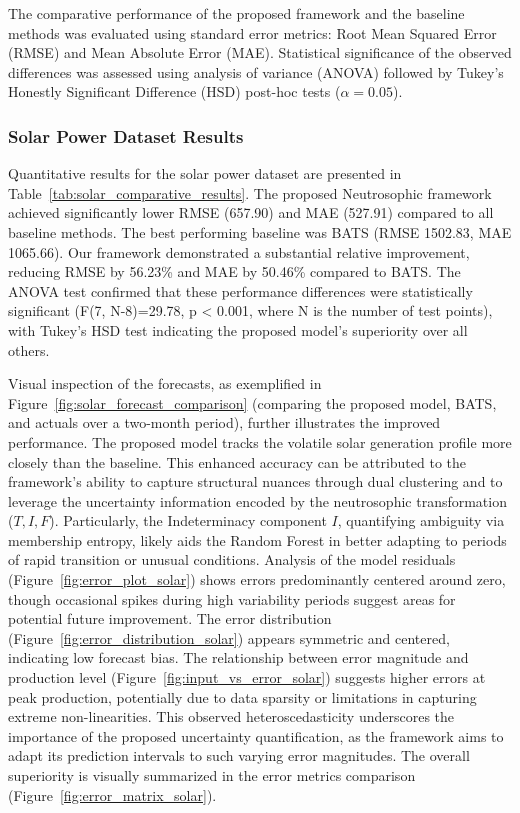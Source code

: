 \documentclass[review,3p,times]{elsarticle}
\begin{document}
The comparative performance of the proposed framework and the baseline methods was evaluated using standard error metrics: Root Mean Squared Error (RMSE) and Mean Absolute Error (MAE). Statistical significance of the observed differences was assessed using analysis of variance (ANOVA) followed by Tukey's Honestly Significant Difference (HSD) post-hoc tests ($\alpha = 0.05$).

\subsubsection{Solar Power Dataset Results}
\label{subsec:solar_results}

Quantitative results for the solar power dataset are presented in Table~\ref{tab:solar_comparative_results}. The proposed Neutrosophic framework achieved significantly lower RMSE (657.90) and MAE (527.91) compared to all baseline methods. The best performing baseline was BATS (RMSE 1502.83, MAE 1065.66). Our framework demonstrated a substantial relative improvement, reducing RMSE by 56.23\% and MAE by 50.46\% compared to BATS. The ANOVA test confirmed that these performance differences were statistically significant (F(7, N-8)=29.78, p < 0.001, where N is the number of test points), with Tukey's HSD test indicating the proposed model's superiority over all others.

Visual inspection of the forecasts, as exemplified in Figure~\ref{fig:solar_forecast_comparison} (comparing the proposed model, BATS, and actuals over a two-month period), further illustrates the improved performance. The proposed model tracks the volatile solar generation profile more closely than the baseline. This enhanced accuracy can be attributed to the framework's ability to capture structural nuances through dual clustering and to leverage the uncertainty information encoded by the neutrosophic transformation ($T, I, F$). Particularly, the Indeterminacy component $I$, quantifying ambiguity via membership entropy, likely aids the Random Forest in better adapting to periods of rapid transition or unusual conditions. Analysis of the model residuals (Figure~\ref{fig:error_plot_solar}) shows errors predominantly centered around zero, though occasional spikes during high variability periods suggest areas for potential future improvement. The error distribution (Figure~\ref{fig:error_distribution_solar}) appears symmetric and centered, indicating low forecast bias. The relationship between error magnitude and production level (Figure~\ref{fig:input_vs_error_solar}) suggests higher errors at peak production, potentially due to data sparsity or limitations in capturing extreme non-linearities. This observed heteroscedasticity underscores the importance of the proposed uncertainty quantification, as the framework aims to adapt its prediction intervals to such varying error magnitudes. The overall superiority is visually summarized in the error metrics comparison (Figure~\ref{fig:error_matrix_solar}).
\end{document}
